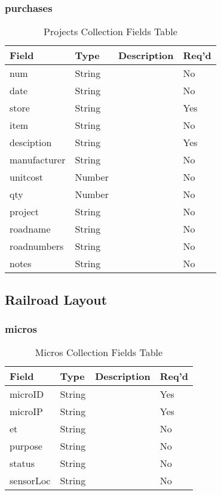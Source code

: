 \subsubsection{purchases}
\begin{table}[H]
    \begin{tabular}{|L{3cm}|L{1.7cm}|L{8.8cm}|L{1.3cm}|}
    \hline
        \textbf{Field} & \textbf{Type} & \textbf{Description} & \textbf{Req'd} \\ \hline
	num & String &  & No \\ \hline
	date & String &  & No \\ \hline
	store & String &  & Yes \\ \hline
	item & String &  & No \\ \hline
	desciption & String &  & Yes \\ \hline
	manufacturer & String &  & No \\ \hline
	unitcost & Number &  & No \\ \hline
	qty & Number &  & No \\ \hline
	project & String &  & No \\ \hline
	roadname & String &  & No \\ \hline
	roadnumbers & String &  & No \\ \hline
	notes & String &  & No \\ \hline
    \end{tabular}
    \caption{\label{structure-table}Projects Collection Fields Table}
    \end{table}
\subsection{Railroad Layout}
\subsubsection{micros}
\begin{table}[H]
    \begin{tabular}{|L{3cm}|L{1.7cm}|L{8.8cm}|L{1.3cm}|}
    \hline
        \textbf{Field} & \textbf{Type} & \textbf{Description} & \textbf{Req'd} \\ \hline
	microID & String &  & Yes \\ \hline
	microIP & String &  & Yes \\ \hline
	et & String &  & No \\ \hline
	purpose & String &  & No \\ \hline
	status & String &  & No \\ \hline
	sensorLoc & String &  & No \\ \hline
    \end{tabular}
    \caption{\label{micro-table}Micros Collection Fields Table}
    \end{table}

